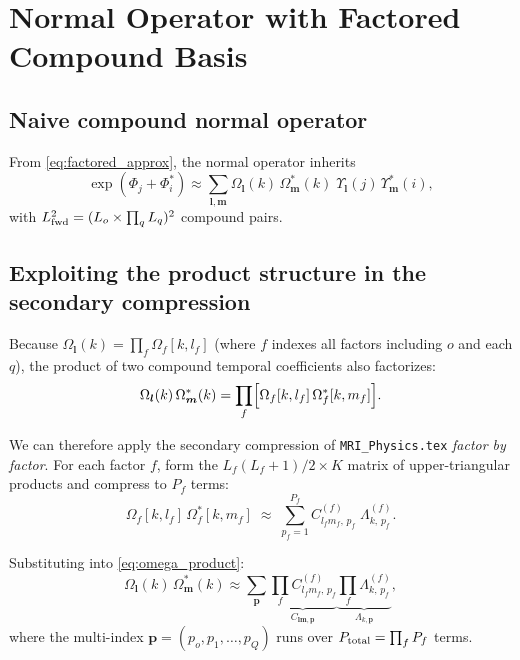 \documentclass{article}
\begin{document}
\section{Normal Operator with Factored Compound Basis}

\subsection{Naive compound normal operator}

From \eqref{eq:factored_approx}, the normal operator inherits
\begin{equation}
    \exp(\Phi_j + \Phi_i^*) \approx
    \sum_{\boldsymbol{l}, \boldsymbol{m}}
    \Omega_{\boldsymbol{l}}(k)\,\Omega_{\boldsymbol{m}}^*(k)\;
    \Upsilon_{\boldsymbol{l}}(j)\,\Upsilon_{\boldsymbol{m}}^*(i),
\end{equation}
with $L_{\rm fwd}^2 = (L_o \times \prod_q L_q)^2$ compound pairs.

\subsection{Exploiting the product structure in the secondary compression}

Because $\Omega_{\boldsymbol{l}}(k) = \prod_{f} \Omega_f[k, l_f]$ (where $f$ indexes
all factors including $o$ and each $q$), the product of two compound temporal
coefficients also factorizes:
\begin{equation}
    \Omega_{\boldsymbol{l}}(k)\,\Omega_{\boldsymbol{m}}^*(k) =
    \prod_{f} \Bigl[\Omega_f[k,l_f]\,\Omega_f^*[k,m_f]\Bigr].
    \label{eq:omega_product}
\end{equation}

We can therefore apply the secondary compression of \texttt{MRI\_Physics.tex}
\emph{factor by factor}.  For each factor $f$, form the $L_f(L_f+1)/2 \times K$
matrix of upper-triangular products and compress to $P_f$ terms:
\begin{equation}
    \Omega_f[k,l_f]\,\Omega_f^*[k,m_f] \;\approx\;
    \sum_{p_f=1}^{P_f} C^{(f)}_{l_f m_f,\,p_f}\;\Lambda^{(f)}_{k,\,p_f}.
    \label{eq:factor_svd2}
\end{equation}

Substituting into \eqref{eq:omega_product}:
\begin{equation}
    \Omega_{\boldsymbol{l}}(k)\,\Omega_{\boldsymbol{m}}^*(k) \approx
    \sum_{\boldsymbol{p}}
    \underbrace{\prod_f C^{(f)}_{l_f m_f,\,p_f}}_{\displaystyle C_{\boldsymbol{l}\boldsymbol{m},\boldsymbol{p}}}
    \underbrace{\prod_f \Lambda^{(f)}_{k,\,p_f}}_{\displaystyle \Lambda_{k,\boldsymbol{p}}},
\end{equation}
where the multi-index $\boldsymbol{p} = (p_o, p_1, \ldots, p_Q)$ runs over
$P_{\rm total} = \prod_f P_f$ terms.
\end{document}
